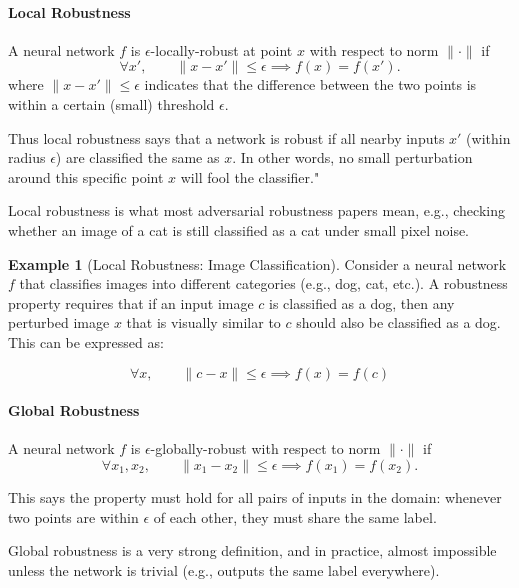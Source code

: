 \documentclass[oneside,11pt,dvipsnames]{book}
\numberwithin{equation}{section}
\theoremstyle{definition}
\newtheorem{example}{Example}[section]
\theoremstyle{remark}
\begin{document}
\paragraph{Local Robustness}
A neural network $f$ is $\epsilon$-locally-robust at point $x$ with respect to norm $\| \cdot \|$ if
\begin{equation}
    \forall x', \qquad \|x-x'\| \leq \epsilon \implies f(x) = f(x').
\end{equation}
where $\|x - x'\| \leq \epsilon$ indicates that the difference between the two points is within a certain (small) threshold $\epsilon$.


Thus local robustness says that a network is robust if all nearby inputs $x'$ (within radius $\epsilon$) are classified the same as $x$. In other words, no small perturbation around this specific point $x$ will fool the classifier."

Local robustness is what most adversarial robustness papers mean, e.g., checking whether an image of a cat is still classified as a cat under small pixel noise.

\begin{example}[Local Robustness: Image Classification]
Consider a neural network $f$ that classifies images into different categories (e.g., dog, cat, etc.). A robustness property requires that if an input image $c$ is classified as a dog, then any perturbed image $x$ that is visually similar to $c$ should also be classified as a dog. This can be expressed as:

\[
\forall x, \qquad \|c - x\| \leq \epsilon \implies f(x) = f(c)
\]

\end{example}



\paragraph{Global Robustness}

A neural network $f$ is $\epsilon$-globally-robust with respect to norm $\| \cdot \|$ if
\begin{equation}
    \forall x_1, x_2, \qquad \|x_1 - x_2\| \leq \epsilon \implies f(x_1) = f(x_2).
\end{equation}

 This says the property must hold for all pairs of inputs in the domain: whenever two points are within $\epsilon$ of each other, they must share the same label.

Global robustness is a very strong definition, and in practice, almost impossible unless the network is trivial (e.g., outputs the same label everywhere).
\end{document}
